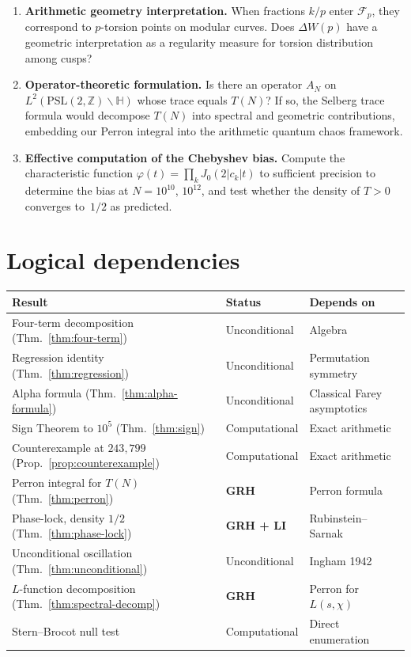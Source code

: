 \documentclass[11pt]{article}
\theoremstyle{definition}
\newcommand{\Z}{\mathbb{Z}}
\newcommand{\F}{\mathcal{F}}
\begin{document}
\begin{enumerate}
  \item \textbf{Arithmetic geometry interpretation.}
    When fractions $k/p$ enter $\F_p$, they correspond to $p$-torsion
    points on modular curves.  Does $\Delta W(p)$ have a geometric
    interpretation as a regularity measure for torsion distribution
    among cusps?

  \item \textbf{Operator-theoretic formulation.}
    Is there an operator $A_N$ on $L^2(\mathrm{PSL}(2,\Z)
    \backslash \mathbb{H})$ whose trace equals $T(N)$?  If so, the
    Selberg trace formula would decompose $T(N)$ into spectral and
    geometric contributions, embedding our Perron integral into the
    arithmetic quantum chaos framework.

  \item \textbf{Effective computation of the Chebyshev bias.}
    Compute the characteristic function
    $\varphi(t) = \prod_k J_0(2|c_k|t)$ to sufficient precision to
    determine the bias at $N = 10^{10}$, $10^{12}$, and test whether
    the density of $T > 0$ converges to~$1/2$ as predicted.
\end{enumerate}



\section*{Logical dependencies}

\begin{center}
\begin{tabular}{lll}
\toprule
Result & Status & Depends on \\
\midrule
Four-term decomposition (Thm.~\ref{thm:four-term}) & Unconditional & Algebra \\
Regression identity (Thm.~\ref{thm:regression}) & Unconditional & Permutation symmetry \\
Alpha formula (Thm.~\ref{thm:alpha-formula}) & Unconditional & Classical Farey asymptotics \\
Sign Theorem to $10^5$ (Thm.~\ref{thm:sign}) & Computational & Exact arithmetic \\
Counterexample at $243{,}799$ (Prop.~\ref{prop:counterexample}) & Computational & Exact arithmetic \\
Perron integral for $T(N)$ (Thm.~\ref{thm:perron}) & \textbf{GRH} & Perron formula \\
Phase-lock, density $1/2$ (Thm.~\ref{thm:phase-lock}) & \textbf{GRH + LI} & Rubinstein--Sarnak \\
Unconditional oscillation (Thm.~\ref{thm:unconditional}) & Unconditional & Ingham 1942 \\
$L$-function decomposition (Thm.~\ref{thm:spectral-decomp}) & \textbf{GRH} & Perron for $L(s,\chi)$ \\
Stern--Brocot null test & Computational & Direct enumeration \\
\bottomrule
\end{tabular}
\end{center}
\end{document}
